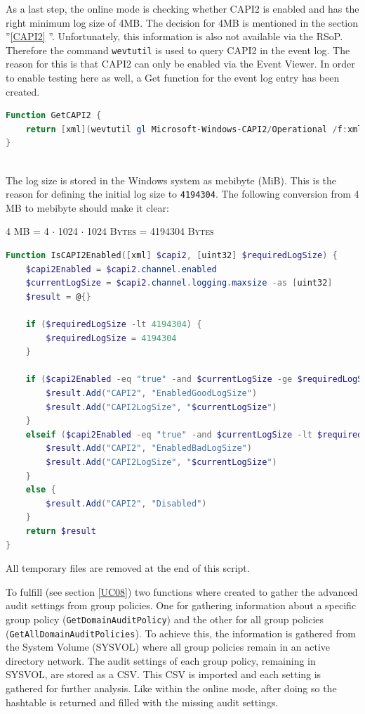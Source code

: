 \clearpage

As a last step, the online mode is checking whether CAPI2 is enabled and has the right minimum log size of 4MB. The decision for 4MB is mentioned in the section ''\ref{CAPI2} ''. Unfortunately, this information is also not available via the RSoP. Therefore the command \lstinline|wevtutil| is used to query CAPI2 in the event log. The reason for this is that CAPI2 can only be enabled via the Event Viewer. \cite{CAPI2} In order to enable testing here as well, a Get function for the event log entry has been created.

\begin{lstlisting}[caption=Function GetCAPI2, language=PowerShell]
Function GetCAPI2 {
    return [xml](wevtutil gl Microsoft-Windows-CAPI2/Operational /f:xml)
}
\end{lstlisting}\ \\
The log size is stored in the Windows system as mebibyte (MiB). This is the reason for defining the initial log size to \lstinline|4194304|. The following conversion from 4 MB to mebibyte should make it clear:
\begin{center}
    \textsc{4 MB = 4 $\cdot$ 1024 $\cdot$ 1024 Bytes = 4194304 Bytes }
\end{center}
\begin{lstlisting}[caption=Function IsCAPI2Enabled, language=PowerShell]
Function IsCAPI2Enabled([xml] $capi2, [uint32] $requiredLogSize) {
    $capi2Enabled = $capi2.channel.enabled
    $currentLogSize = $capi2.channel.logging.maxsize -as [uint32]
    $result = @{}

    if ($requiredLogSize -lt 4194304) {
        $requiredLogSize = 4194304
    }

    if ($capi2Enabled -eq "true" -and $currentLogSize -ge $requiredLogSize) {
        $result.Add("CAPI2", "EnabledGoodLogSize")
        $result.Add("CAPI2LogSize", "$currentLogSize")
    }
    elseif ($capi2Enabled -eq "true" -and $currentLogSize -lt $requiredLogSize) {
        $result.Add("CAPI2", "EnabledBadLogSize")
        $result.Add("CAPI2LogSize", "$currentLogSize")
    }
    else {
        $result.Add("CAPI2", "Disabled")
    }
    return $result
}  
\end{lstlisting}
All temporary files are removed at the end of this script.
\clearpage

To fulfill  (see section \ref{UC08}) two functions where created to gather the advanced audit settings from group policies. One for gathering information about a specific group policy (\lstinline|GetDomainAuditPolicy|) and the other for all group policies (\lstinline|GetAllDomainAuditPolicies|). To achieve this, the information is gathered from the System Volume (SYSVOL) where all group policies remain in an active directory network. The audit settings of each group policy, remaining in SYSVOL, are stored as a CSV. This CSV is imported and each setting is gathered for further analysis. Like within the online mode, after doing so the hashtable is returned and filled with the missing audit settings. 

